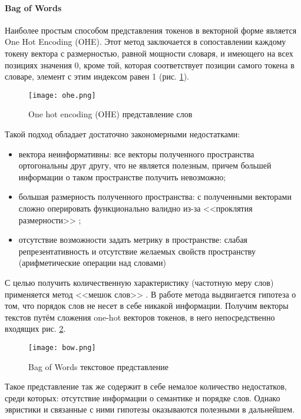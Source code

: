 \paragraph{Bag of Words}
\par
Наиболее простым способом представления токенов в векторной форме является One Hot Encoding (OHE). Этот метод заключается в сопоставлении каждому токену вектора с размерностью, равной мощности словаря, и имеющего на всех позициях значения 0, кроме той, которая соответствует позиции самого токена в словаре, элемент с этим индексом равен 1 (рис. \ref{fig:ohe}).
\begin{figure}[H]
    \centering
    \texttt{[image: ohe.png]}
    \caption{One hot encoding (OHE) представление слов}
    \label{fig:ohe}
\end{figure}
\bigskip\par
Такой подход обладает достаточно закономерными недостатками:
\begin{itemize}
    \item вектора неинформативны: все векторы полученного пространства ортогональны друг другу, что не является полезным, причем большей информации о таком пространстве получить невозможно;
    \item большая размерность полученного пространства: с полученными векторами сложно оперировать функционально валидно из-за <<проклятия размерности>> \cite{curse};
    \item отсутствие возможности задать метрику в пространстве: слабая репрезентативность и отсутствие желаемых свойств пространству (арифметические операции над словами)
\end{itemize}
\bigskip\par
С целью получить количественную характеристику (частотную меру слов) применяется метод <<мешок слов>> \cite{harris54}. В работе метода выдвигается гипотеза о том, что порядок слов не несет в себе никакой информации. Получим векторы текстов путём сложения one-hot векторов токенов, в него непосредственно входящих рис. \ref{fig:bow}. 
\begin{figure}
    \centering
    \texttt{[image: bow.png]}
    \caption{Bag of Words текстовое представление}
    \label{fig:bow}
\end{figure}
Такое представление так же содержит в себе немалое количество недостатков, среди которых: отсутствие информации о семантике и порядке слов. Однако эвристики и связанные с ними гипотезы оказываются полезными в дальнейшем. 
